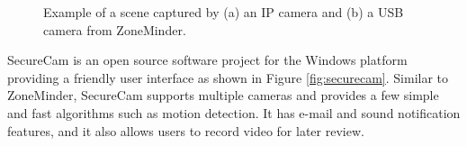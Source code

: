 \begin{figure}[t]
  \begin{center}
    \hspace{0.1in}
  \end{center}
  \caption[Example of a scene captured by ZoneMinder.]{\small Example
    of a scene captured by (a) an IP camera and (b) a USB camera from
    ZoneMinder.}
  \label{fig:zm-webcam}
\end{figure}

SecureCam  is an open source software project for
the Windows platform providing a friendly user interface as shown in Figure
\ref{fig:securecam}. Similar to ZoneMinder, SecureCam supports multiple cameras
and provides a few simple and fast algorithms such as motion detection. It has
e-mail and sound notification features, and it also allows users to record
video for later review.

